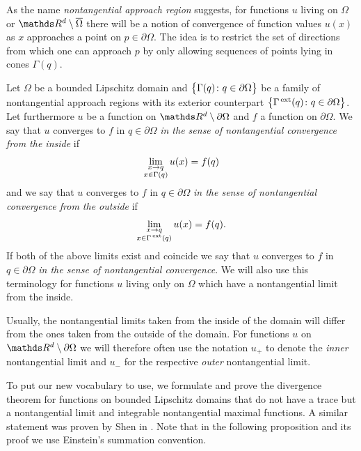 As the name \emph{nontangential approach region} suggests, for functions $u$ living on $\Omega$ or $\R^d \setminus \overline\Omega$ there will be a notion of convergence of function values $u(x)$ as $x$ approaches a point on $p \in \partial\Omega$.
The idea is to restrict the set of directions from which one can approach $p$ by only allowing sequences of points lying in cones $\Gamma(q)$.

\begin{defn}
  Let $\Omega$ be a bounded Lipschitz domain and $\big\{\Gamma(q) \colon q \in \partial\Omega\big\}$ be a family of nontangential approach regions with its exterior counterpart $\big\{\Gamma^{\,\mathrm{ext}}(q) \colon q \in \partial\Omega\big\}$.
  Let furthermore $u$ be a function on $\R^d \setminus \partial\Omega$ and $f$ a function on $\partial\Omega$.
  We say that $u$ converges to $f$ in $q \in \partial\Omega$ \emph{in the sense of nontangential convergence from the inside} if 
  \begin{align*}
    \lim_{\substack{ x \to q \\ x \in \Gamma(q)}} u(x) = f(q)
  \end{align*}
  and we say that $u$ converges to $f$ in $q \in \partial\Omega$ \emph{in the sense of nontangential convergence from the outside} if 
  \begin{align*}
    \lim_{\substack{ x \to q \\ x \in \Gamma^{\,\mathrm{ext}}(q)}} u(x) = f(q).
  \end{align*}
  If both of the above limits exist and coincide we say that $u$ converges to $f$ in $q \in \partial\Omega$ \emph{in the sense of nontangential convergence}. 
  We will also use this terminology for functions $u$ living only on $\Omega$ which have a nontangential limit from the inside.
\end{defn}

Usually, the nontangential limits taken from the inside of the domain will differ from the ones taken from the outside of the domain.
For functions $u$ on $\R^d \setminus \partial\Omega$ we will therefore often use the notation $u_+$ to denote the \emph{inner} nontangential limit and $u_-$ for the respective \emph{outer} nontangential limit.

To put our new vocabulary to use, we formulate and prove the divergence theorem for functions on bounded Lipschitz domains that do not have a trace but a nontangential limit and integrable nontangential maximal functions. A similar statement was proven by Shen in \cite[Thm.\@~7.1.6]{Shen2017}. 
Note that in the following proposition and its proof we use Einstein's summation convention.

